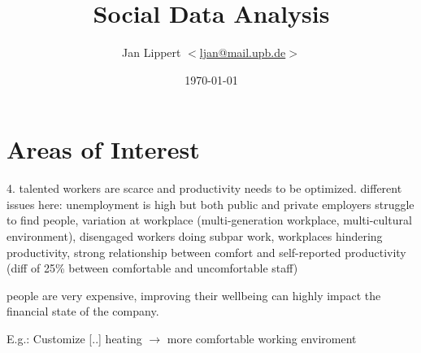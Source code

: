 \documentclass[journal,10pt]{IEEEtran}
\title{Social Data Analysis}
\author{Jan Lippert \(<\)\href{mailt:ljan@mail.upb.de}{ljan@mail.upb.de}\(>\)}
\date{\today}
\begin{document}
\maketitle

%




\section{Areas of Interest}








4. talented workers are scarce and productivity needs to be optimized. different issues here: unemployment is high but both public and private employers struggle to find people, variation at workplace (multi-generation workplace, multi-cultural environment), disengaged workers doing subpar work, workplaces hindering productivity, strong relationship between comfort and self-reported productivity (diff of 25\% between comfortable and uncomfortable staff)\cite{hub13}

people are very expensive, improving their wellbeing can highly impact the financial state of the company. \cite{hub13}


E.g.: Customize [..] heating \(\rightarrow\) more comfortable working enviroment\cite{iotagenda}

% 

  

\end{document}
